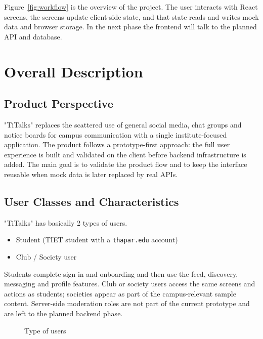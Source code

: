 \documentclass{scrreprt}
\begin{document}
\newline
Figure~\ref{fig:workflow} is the overview of the project. The user interacts with React screens, the screens update client-side state, and that state reads and writes mock data and browser storage. In the next phase the frontend will talk to the planned API and database.

\chapter{Overall Description}

\section{Product Perspective}
"TiTalks" replaces the scattered use of general social media, chat groups and notice boards for campus communication with a single institute-focused application. The product follows a prototype-first approach: the full user experience is built and validated on the client before backend infrastructure is added. The main goal is to validate the product flow and to keep the interface reusable when mock data is later replaced by real APIs.

\section{User Classes and Characteristics}
"TiTalks" has basically 2 types of users.
\begin{itemize}
  \item Student (TIET student with a \texttt{thapar.edu} account)
  \item Club / Society user
\end{itemize}
Students complete sign-in and onboarding and then use the feed, discovery, messaging and profile features. Club or society users access the same screens and actions as students; societies appear as part of the campus-relevant sample content. Server-side moderation roles are not part of the current prototype and are left to the planned backend phase.
\begin{figure}[h!]
\centering
{}
\caption{Type of users}
\label{fig:usertypes}
\end{figure}
\end{document}
